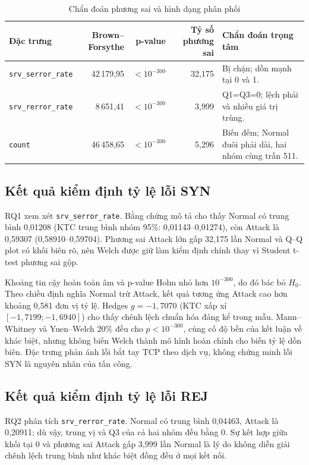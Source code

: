 \documentclass[../main.tex]{subfiles}
\begin{document}
\begin{table}[H]
\centering
\caption{Chẩn đoán phương sai và hình dạng phân phối}
\label{tab:t35:assumptions}
\small
\setlength{\tabcolsep}{4pt}
\begin{tabularx}{\textwidth}{lrrrX}
\toprule
Đặc trưng & Brown--Forsythe & p-value & Tỷ số phương sai & Chẩn đoán trọng tâm \\
\midrule
\texttt{srv\_serror\_rate} & 42\,179,95 & $<10^{-300}$ & 32,175 & Bị chặn; dồn mạnh tại 0 và 1. \\
\texttt{srv\_rerror\_rate} & 8\,651,41 & $<10^{-300}$ & 3,999 & Q1=Q3=0; lệch phải và nhiều giá trị trùng. \\
\texttt{count} & 46\,458,65 & $<10^{-300}$ & 5,296 & Biến đếm; Normal đuôi phải dài, hai nhóm cùng trần 511. \\
\bottomrule
\end{tabularx}
\end{table}

\subsection{Kết quả kiểm định tỷ lệ lỗi SYN}
\label{sec:t35:rq1}

RQ1 xem xét \texttt{srv\_serror\_rate}. Bằng chứng mô tả cho thấy Normal có trung
bình 0,01208 (KTC trung bình nhóm 95\%: 0,01143--0,01274), còn Attack là 0,59307
(0,58910--0,59704). Phương sai Attack lớn gấp 32,175 lần Normal và Q--Q plot có khối
biên rõ, nên Welch được giữ làm kiểm định chính thay vì Student t-test phương sai gộp.

Khoảng tin cậy hoàn toàn âm và p-value Holm nhỏ hơn $10^{-300}$, do đó bác bỏ
$H_0$. Theo chiều định nghĩa Normal trừ Attack, kết quả tương ứng Attack cao hơn khoảng
0,581 đơn vị tỷ lệ. Hedges $g=-1{,}7070$ (KTC xấp xỉ
$[-1{,}7199;-1{,}6940]$) cho thấy chênh lệch chuẩn hóa đáng kể trong mẫu. Mann--Whitney
và Yuen--Welch 20\% đều cho $p<10^{-300}$, củng cố độ bền của kết luận về khác biệt,
nhưng không biến Welch thành mô hình hoàn chỉnh cho biến tỷ lệ dồn biên. Đặc trưng phản
ánh lỗi bắt tay TCP theo dịch vụ, không chứng minh lỗi SYN là nguyên nhân của tấn công.

\subsection{Kết quả kiểm định tỷ lệ lỗi REJ}
\label{sec:t35:rq2}

RQ2 phân tích \texttt{srv\_rerror\_rate}. Normal có trung bình 0,04463, Attack là
0,20911; dù vậy, trung vị và Q3 của cả hai nhóm đều bằng 0. Sự kết hợp giữa khối tại 0
và phương sai Attack gấp 3,999 lần Normal là lý do không diễn giải chênh lệch trung
bình như khác biệt đồng đều ở mọi kết nối.
\end{document}
